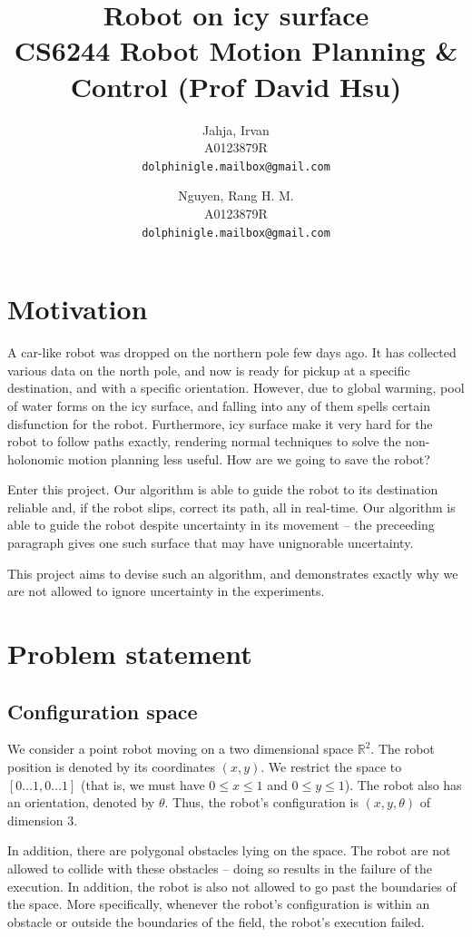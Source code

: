 \documentclass[a4paper]{article}
\title{Robot on icy surface \\ {\small CS6244 Robot Motion Planning \& Control (Prof David Hsu)} }
\author{
  Jahja, Irvan\\
  {\small A0123879R} \\ \texttt{dolphinigle.mailbox@gmail.com}
  \and
  Nguyen, Rang H. M.\\
  {\small A0123879R} \\ \texttt{dolphinigle.mailbox@gmail.com}
}
\begin{document}
\maketitle

\section{Motivation}
A car-like robot was dropped on the northern pole few days ago. It has collected various
data on the north pole, and now is ready for pickup at a specific destination,
and with a specific orientation. However, due to global warming, pool of water
forms on the icy surface, and falling into any of them spells certain disfunction
for the robot. Furthermore, icy surface make it very hard for the robot to
follow paths exactly, rendering normal techniques to solve the non-holonomic
motion planning less useful. How are we going to save the robot?

Enter this project. Our algorithm is able to guide the robot to its destination
reliable and, if the robot slips, correct its path, all in real-time. Our algorithm
is able to guide the robot despite uncertainty in its movement -- the preceeding
paragraph gives one such surface that may have unignorable uncertainty.

This project aims to devise such an algorithm, and demonstrates exactly why
we are not allowed to ignore uncertainty in the experiments.

\section{Problem statement}

\subsection{Configuration space}
We consider a point robot moving on a two dimensional space $\mathbb{R}^2$.
The robot position is denoted by its coordinates $(x, y)$. We restrict the space
to $[0\ldots1, 0\ldots1]$ (that is, we must have $0 \le x \le 1$ and $0 \le y \le 1$).
The robot also has an orientation, denoted by $\theta$. Thus, the robot's
configuration is $(x, y, \theta)$ of dimension $3$.

In addition, there are polygonal obstacles lying on the space. The robot
are not allowed to collide with these obstacles -- doing so results in the
failure of the execution. In addition, the robot is also not allowed to go
past the boundaries of the space. More specifically, whenever the robot's
configuration is within an obstacle or outside the boundaries of the field,
the robot's execution failed.
\end{document}
